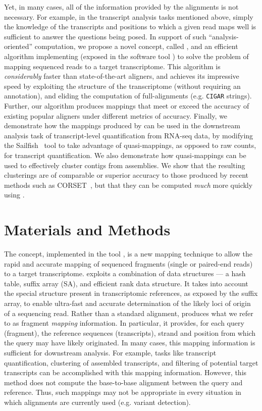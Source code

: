 Yet, in many cases, all of the information provided by the alignments is not necessary.  For example, in the transcript analysis tasks mentioned above, simply the knowledge of the transcripts and positions to which a given read maps well is sufficient to answer the questions being posed. In support of such ``analysis-oriented'' computation, we propose a novel concept, called \qm, and an efficient algorithm implementing \qm (exposed in the software tool \rapmap) to solve the problem of mapping sequenced reads to a target transcriptome. This algorithm is \textit{considerably} faster than state-of-the-art aligners, and achieves its impressive speed by exploiting the structure of the transcriptome (without requiring an annotation), and eliding the computation of full-alignments (e.g. \texttt{CIGAR} strings). Further, our algorithm produces mappings that meet or exceed the accuracy of existing popular aligners under different metrics of accuracy.  Finally, we demonstrate how the mappings produced by \rapmap can be used in the downstream analysis task of transcript-level quantification from RNA-seq data, by modifying the Sailfish~\citep{sailfish} tool to take advantage of quasi-mappings, as opposed to raw \kmer counts, for transcript quantification. We also demonstrate how quasi-mappings can be used to effectively cluster contigs from \denovo assemblies.  We show that the resulting clusterings are of comparable or superior accuracy to those produced by recent methods such as CORSET~\citep{corset}, but that they can be computed \textit{much} more quickly using \qm.

\section{Materials and Methods} \label{sec:methods}

The \qm concept, implemented in the tool \rapmap, is a new mapping technique to allow the rapid and accurate mapping of sequenced fragments (single or paired-end reads) to a target transcriptome.  \rapmap exploits a combination of data structures --- a hash table, suffix array (SA), and efficient rank data structure.  It takes into account the special structure present in transcriptomic references, as exposed by the suffix array, to enable ultra-fast and accurate determination of the likely loci of origin of a sequencing read.  Rather than a standard alignment, \qm produces what we refer to as fragment \textit{mapping} information. In particular, it provides, for each query (fragment), the reference sequences (transcripts), strand and position from which the query may have likely originated.  In many cases, this mapping information is sufficient for downstream analysis. For example, tasks like transcript quantification, clustering of \denovo assembled transcripts, and filtering of potential target transcripts can be accomplished with this mapping information.  However, this method does not compute the base-to-base alignment between the query and reference.  Thus, such mappings may not be appropriate in every situation in which alignments are currently used (e.g. variant detection).

